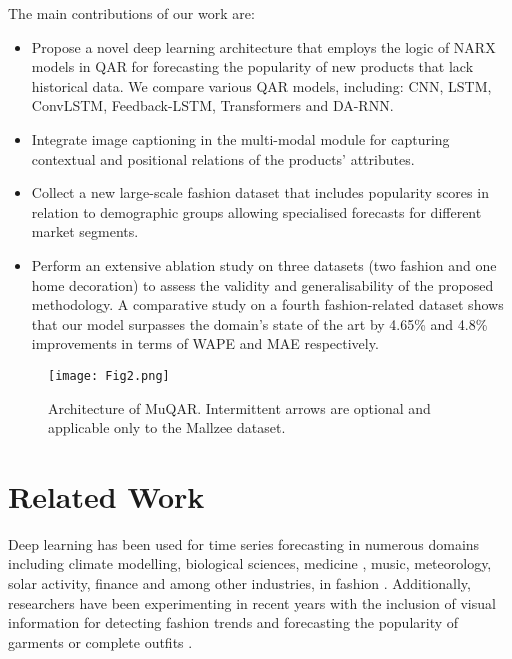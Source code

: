 \documentclass{article}
\begin{document}
The main contributions of our work are:

\begin{itemize}

\item Propose a novel deep learning architecture that employs the logic of NARX models in QAR for forecasting the popularity of new products that lack historical data. We compare various QAR models, including: CNN, LSTM, ConvLSTM, Feedback-LSTM, Transformers and DA-RNN.

\item Integrate image captioning in the multi-modal module for capturing contextual and positional relations of the products' attributes.

\item Collect a new large-scale fashion dataset that includes popularity scores in relation to demographic groups allowing specialised forecasts for different market segments.

\item Perform an extensive ablation study on three datasets (two fashion and one home decoration) to assess the validity and generalisability of the proposed methodology. A comparative study on a fourth fashion-related dataset shows that our model surpasses the domain's state of the art by 4.65\% and 4.8\% improvements in terms of WAPE and MAE respectively.

\end{itemize}

\begin{figure*}[!ht]
    \centering
    \texttt{[image: Fig2.png]}
    \caption{Architecture of MuQAR. Intermittent arrows are optional 
and applicable only to the Mallzee dataset.}
    \label{fig:MuQAR}
\end{figure*}


\section{Related Work}
\label{sec:RW}

Deep learning has been used for time series forecasting in numerous domains including climate modelling, biological sciences, medicine \cite{lim2021time}, music, meteorology, solar activity, finance \cite{koutlis2020lavarnet} and among other industries, in fashion \cite{chang2021fashion}.
Additionally, researchers have been experimenting in recent years with the inclusion of visual information for detecting fashion trends and forecasting the popularity of garments or complete outfits \cite{cheng2021fashion}. 
\end{document}
